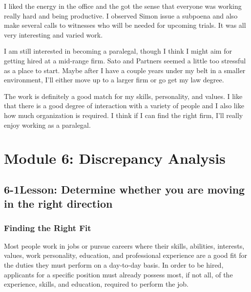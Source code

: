 I liked the energy in the office and the got the sense that everyone was working really hard and being productive. I observed Simon issue a subpoena and also make several calls to witnesses who will be needed for upcoming trials. It was all very interesting and varied work.

I am still interested in becoming a paralegal, though I think I might aim for getting hired at a mid-range firm. Sato and Partners seemed a little too stressful as a place to start. Maybe after I have a couple years under my belt in a smaller environment, I'll either move up to a larger firm or go get my law degree.

The work is definitely a good match for my skills, personality, and values. I like that there is a good degree of interaction with a variety of people and I also like how much organization is required. I think if I can find the right firm, I'll really enjoy working as a paralegal.


\pagebreak \section*{Module 6:	Discrepancy  Analysis}
\noindent\makebox[\textwidth]{\rule{\linewidth}{0.4pt}}  \localtableofcontents
\noindent\makebox[\textwidth]{\rule{\linewidth}{0.4pt}}


\pagebreak \subsection*{6-1\quad Lesson: Determine whether you are moving in the right direction}

\subsubsection*{Finding the Right Fit}

Most people work in jobs or pursue careers where their skills, abilities, interests, values, work personality, education, and professional experience are a good fit for the duties they must perform on a day-to-day basis. In order to be hired, applicants for a specific position must already possess most, if not all, of the experience, skills, and education, required to perform the job.

